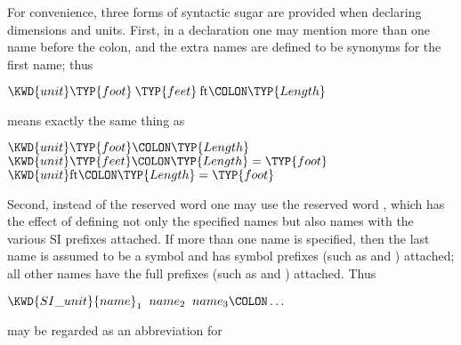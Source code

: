For convenience, three forms of syntactic sugar are provided when declaring
dimensions and units.
First, in a  declaration one may mention more than one name
before the colon, and the extra names are defined to be synonyms for the
first name; thus
\begin{Fortress}
\(\KWD{unit} \TYP{foot}\mskip 4mu plus 4mu\TYP{feet}\mskip 4mu plus 4mu\mathrm{ft}\COLON \TYP{Length}\)
\end{Fortress}
means exactly the same thing as
\begin{Fortress}
\(\KWD{unit} \TYP{foot}\COLON \TYP{Length}\)\\
\(\KWD{unit} \TYP{feet}\COLON \TYP{Length} = \TYP{foot}\)\\
\(\KWD{unit} \mathrm{ft}\COLON \TYP{Length} = \TYP{foot}\)
\end{Fortress}
Second, instead of the reserved word  one may use the reserved
word , which has the effect of defining not only the
specified names but also names with the various SI prefixes attached.
If more than one name is specified, then the last name is assumed
to be a symbol and has symbol prefixes (such as  and )
attached; all other names have the full prefixes (such as
 and ) attached.
Thus
\begin{Fortress}
\(\KWD{SI{\char'137}unit} {name}_{1}\;\;{name}_{2}\;\;{name}_{3}\COLON \ldots\)
\end{Fortress}
may be regarded as an abbreviation for
